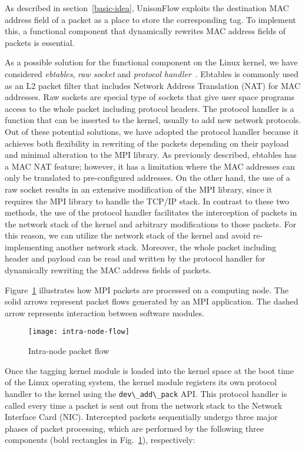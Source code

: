 As described in section~\ref{basic-idea}, UnisonFlow exploits the
destination MAC address field of a packet as a place to store the
corresponding tag. To implement this, a functional component that
dynamically rewrites MAC address fields of packets is essential.

As a possible solution for the functional component on the Linux kernel,
we have considered \emph{ebtables}, \emph{raw socket} and \emph{protocol
handler}~\autocite{Rosen2013}. Ebtables is commonly used as an L2
packet filter that includes Network Address Translation (NAT) for MAC
addresses. Raw sockets are special type of sockets that give user space
programs access to the whole packet including protocol headers. The
protocol handler is a function that can be inserted to the kernel,
usually to add new network protocols. Out of these potential solutions,
we have adopted the protocol handler because it achieves both
flexibility in rewriting of the packets depending on their payload and
minimal alteration to the MPI library. As previously described, ebtables
has a MAC NAT feature; however, it has a limitation where the MAC
addresses can only be translated to pre-configured addresses. On the
other hand, the use of a raw socket results in an extensive modification
of the MPI library, since it requires the MPI library to handle the
TCP/IP stack. In contrast to these two methods, the use of the protocol
handler facilitates the interception of packets in the network stack of
the kernel and arbitrary modifications to those packets. For this
reason, we can utilize the network stack of the kernel and avoid
re-implementing another network stack. Moreover, the whole packet
including header and payload can be read and written by the protocol
handler for dynamically rewriting the MAC address fields of packets.

Figure~\ref{fig:intra-node-flow} illustrates how MPI packets are
processed on a computing node. The solid arrows represent packet flows
generated by an MPI application. The dashed arrow represents interaction
between software modules.

\begin{figure}
    \centering
    \texttt{[image: intra-node-flow]}
    \caption{Intra-node packet flow}%
    \label{fig:intra-node-flow}
\end{figure}

Once the tagging kernel module is loaded into the kernel space at the
boot time of the Linux operating system, the kernel module registers its
own protocol handler to the kernel using the
\lstinline!dev\_add\_pack! API\@. This protocol handler is
called every time a packet is sent out from the network stack to the
Network Interface Card (NIC). Intercepted packets sequentially undergo
three major phases of packet processing, which are performed by the
following three components (bold rectangles in
Fig.~\ref{fig:intra-node-flow}), respectively:

